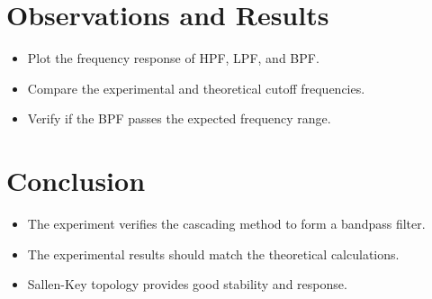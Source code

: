\documentclass[a4paper,12pt]{article}
\begin{document}
\section{Observations and Results}
\begin{itemize}
    \item Plot the frequency response of HPF, LPF, and BPF.
    \item Compare the experimental and theoretical cutoff frequencies.
    \item Verify if the BPF passes the expected frequency range.
\end{itemize}

\section{Conclusion}
\begin{itemize}
    \item The experiment verifies the cascading method to form a bandpass filter.
    \item The experimental results should match the theoretical calculations.
    \item Sallen-Key topology provides good stability and response.
\end{itemize}
\end{document}
